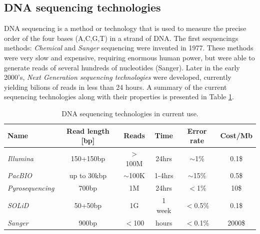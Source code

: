 \subsection{DNA sequencing technologies}
\label{sec:chap1:DNA-sequencing}
DNA sequencing is a method or technology that is used to measure the
precise order of the four bases (A,C,G,T) in a strand of DNA. The
first sequencings methods: {\em Chemical} and {\em Sanger} sequencing
were invented in 1977. These methods were very slow and expensive,
requiring enormous human power, but were able to generate reads of
several hundreds of nucleotides (Sanger). Later in the early 2000's,
{\em Next Generation sequencing technologies} were developed,
currently yielding bilions of reads in less than 24 hours. A summary
of the current sequencing technologies along with their properties is
presented in Table \ref{tab:chap1:sequencing}.

\begin{table}[h]
\centering
\caption{DNA sequencing technologies in current use.}
\begin{tabular}{|l|c|c|c|c|c|}
	\hline
   {\bf Name} & {\bf Read length} [bp] & {\bf Reads} & {\bf
     Time} & {\bf Error rate} & {\bf Cost/Mb} \\
   \hline
   {\em Illumina} & 150+150bp & $>$100M & 24hrs & $\sim$1\% & 0.1\$ \\ \hline
   {\em PacBIO} & up to 30kbp & $\sim$100K & 1-4hrs & $\sim$15\% &
   0.5\$ \\ \hline
   {\em Pyrosequencing} & 700bp & 1M & 24hrs & $<$1\% & 10\$ \\ \hline
   {\em SOLiD} & 50+50bp & 1G & 1 week & $<$0.5\% & 0.1\$ \\ \hline
   {\em Sanger} & 900bp & $<$100 & hours & $<$0.1\% & 2000\$ \\ \hline
\end{tabular}
\label{tab:chap1:sequencing}
\end{table}



